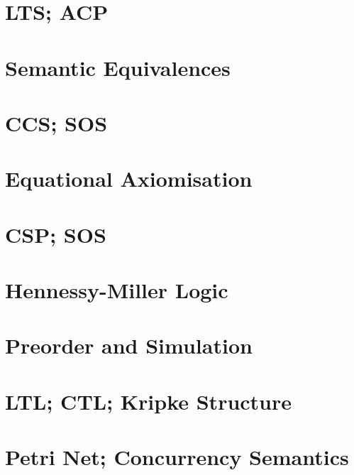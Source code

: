 \documentclass{article}
\begin{document}
\begin{multicols*}{3}

\section{LTS; ACP}


\section{Semantic Equivalences}


\section{CCS; SOS}


\section{Equational Axiomisation}


\section{CSP; SOS}


\section{Hennessy-Miller Logic}


\section{Preorder and Simulation}


\section{LTL; CTL; Kripke Structure}


\section{Petri Net; Concurrency Semantics}


\end{multicols*}
\end{document}
